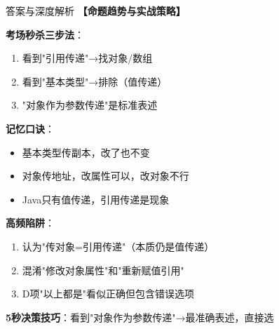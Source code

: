 \documentclass[12pt, a4paper]{ctexart}
\begin{document}
\begin{enumerate}[label=\textbf{\arabic*.}]
\begin{bluebox}{答案与深度解析}
		      \textbf{【命题趋势与实战策略】}

		      \textbf{考场秒杀三步法}：
		      \begin{enumerate}[label={}, nosep]
			      \item 看到"引用传递"→找对象/数组
			      \item 看到"基本类型"→排除（值传递）
			      \item "对象作为参数传递"是标准表述
		      \end{enumerate}

		      \textbf{记忆口诀}：
		      \begin{itemize}[label={}, nosep]
			      \item 基本类型传副本，改了也不变
			      \item 对象传地址，改属性可以，改对象不行
			      \item Java只有值传递，引用传递是现象
		      \end{itemize}

		      \textbf{高频陷阱}：
		      \begin{enumerate}[label={}, nosep]
			      \item 认为"传对象=引用传递"（本质仍是值传递）
			      \item 混淆"修改对象属性"和"重新赋值引用"
			      \item D项"以上都是"看似正确但包含错误选项
		      \end{enumerate}

		      \textbf{5秒决策技巧}：看到"对象作为参数传递"→最准确表述，直接选
	      \end{bluebox}

\end{enumerate}
\end{document}
